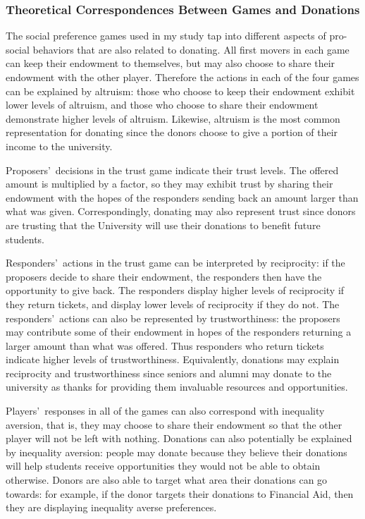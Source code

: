 \documentclass[12pt]{article}
\begin{document}
\subsubsection{Theoretical Correspondences Between Games and Donations}

The social preference games used in my study tap into different aspects of pro-social behaviors that are also related to donating. All first movers in each game 
can keep their endowment to themselves, but may also choose to share their endowment with the other player. Therefore the actions in each of the four games can be explained by altruism: those who choose to keep their endowment exhibit lower levels of altruism, and those who choose to share their endowment demonstrate higher levels of altruism. Likewise, altruism is the most common representation for donating since the donors choose to give a portion of their income to the university.

Proposers\rq \ decisions in the trust game indicate their trust levels. The offered amount is multiplied by a factor, so they may exhibit trust by sharing their endowment with the hopes of the responders sending back an amount larger than what was given. Correspondingly, donating may also represent trust since donors are trusting that the University will use their donations to benefit future students.

Responders\rq \ actions in the trust game can be interpreted by reciprocity: if the proposers decide to share their endowment, the responders then have the opportunity to give back. The responders display higher levels of reciprocity if they return tickets, and display lower levels of reciprocity if they do not. The responders\rq \ actions can also be represented by trustworthiness: the proposers may contribute some of their endowment in hopes of the responders returning a larger amount than what was offered. Thus responders who return tickets indicate higher levels of trustworthiness. Equivalently, donations may explain reciprocity and trustworthiness since seniors and alumni may donate to the university as thanks for providing them invaluable resources and opportunities.

Players\rq \ responses in all of the games can also correspond with inequality aversion, that is, they may choose to share their endowment so that the other player will not be left with nothing. Donations can also potentially be explained by inequality aversion: people may donate because they believe their donations will help students receive opportunities they would not be able to obtain otherwise. Donors are also able to target what area their donations can go towards: for example, if the donor targets their donations to Financial Aid, then they are displaying inequality averse preferences.
\end{document}
